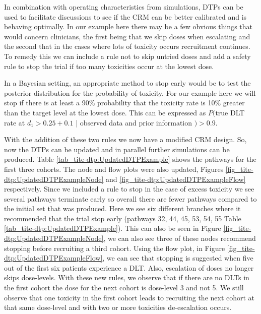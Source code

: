 In combination with operating characteristics from simulations, DTPs can be used to facilitate discussions to see if the CRM can be better calibrated and is behaving optimally. In our example here there may be a few obvious things that would concern clinicians, the first being that we skip doses when escalating and the second that in the cases where lots of toxicity occurs recruitment continues. To remedy this we can include a rule not to skip untried doses and add a safety rule to stop the trial if too many toxicities occur at the lowest dose. 

In a Bayesian setting, an appropriate method to stop early would be to test the posterior distribution for the probability of toxicity. For our example here we will stop if there is at least a 90\% probability that the toxicity rate is 10\% greater than the target level at the lowest dose. This can be expressed as $P($true DLT rate at $d_1 > 0.25 + 0.1$ | observed data and prior information $) > 0.9$. 

With the addition of these two rules we now have a modified CRM design. So, now the DTPs can be updated and in parallel further simulations can be produced. Table \ref{tab_tite-dtp:UpdatedDTPExample} shows the pathways for the first three cohorts. The node and flow plots were also updated, Figures \ref{fig_tite-dtp:UpdatedDTPExampleNode} and \ref{fig_tite-dtp:UpdatedDTPExampleFlow} respectively. Since we included a rule to stop in the case of excess toxicity we see several pathways terminate early so overall there are fewer pathways compared to the initial set that was produced. Here we see six different branches where it recommended that the trial stop early (pathways 32, 44, 45, 53, 54, 55 Table \ref{tab_tite-dtp:UpdatedDTPExample}). This can also be seen in Figure \ref{fig_tite-dtp:UpdatedDTPExampleNode}, we can also see three of these nodes recommend stopping before recruiting a third cohort. Using the flow plot, in Figure \ref{fig_tite-dtp:UpdatedDTPExampleFlow}, we can see that stopping is suggested when five out of the first six patients experience a DLT. Also, escalation of doses no longer skips dose-levels. With these new rules, we observe that if there are no DLTs in the first cohort the dose for the next cohort is dose-level 3 and not 5. We still observe that one toxicity in the first cohort leads to recruiting the next cohort at that same dose-level and with two or more toxicities de-escalation occurs. 

